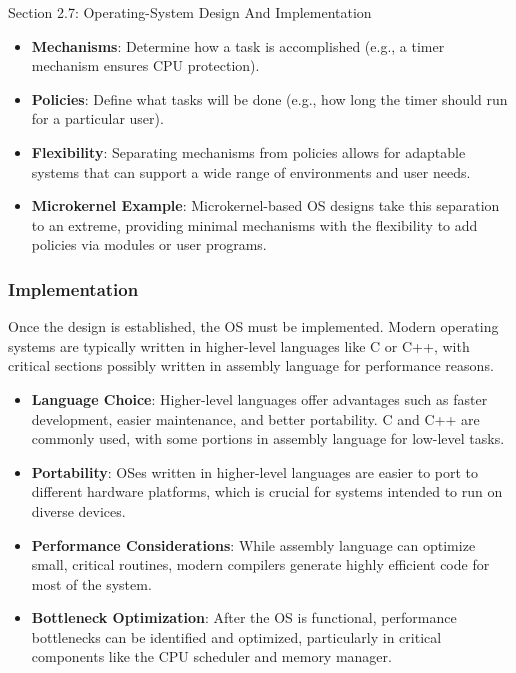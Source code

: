 \begin{notes}{Section 2.7: Operating-System Design And Implementation}
    \begin{highlight}
    
    \begin{itemize}
        \item \textbf{Mechanisms}: Determine how a task is accomplished (e.g., a timer mechanism ensures CPU protection).
        \item \textbf{Policies}: Define what tasks will be done (e.g., how long the timer should run for a particular user).
        \item \textbf{Flexibility}: Separating mechanisms from policies allows for adaptable systems that can support a wide range of environments and user needs.
        \item \textbf{Microkernel Example}: Microkernel-based OS designs take this separation to an extreme, providing minimal mechanisms with the flexibility to add policies via modules or user programs.
    \end{itemize}
    
    \end{highlight}
    
    \subsubsection*{Implementation}
    
    Once the design is established, the OS must be implemented. Modern operating systems are typically written in higher-level languages like C or C++, with critical sections possibly written in assembly 
    language for performance reasons.
    
    \begin{highlight}[Implementation]
    
    \begin{itemize}
        \item \textbf{Language Choice}: Higher-level languages offer advantages such as faster development, easier maintenance, and better portability. C and C++ are commonly used, with some portions 
        in assembly language for low-level tasks.
        \item \textbf{Portability}: OSes written in higher-level languages are easier to port to different hardware platforms, which is crucial for systems intended to run on diverse devices.
        \item \textbf{Performance Considerations}: While assembly language can optimize small, critical routines, modern compilers generate highly efficient code for most of the system.
        \item \textbf{Bottleneck Optimization}: After the OS is functional, performance bottlenecks can be identified and optimized, particularly in critical components like the CPU scheduler and memory manager.
    \end{itemize}
    

\end{highlight}
\end{notes}
